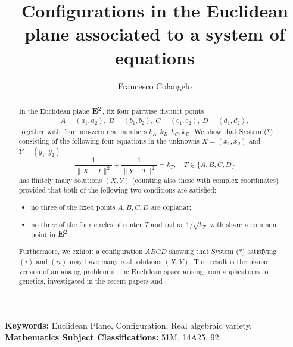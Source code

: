 \documentclass[10pt]{amsart}
\theoremstyle{definition}
\theoremstyle{remark}
\begin{document}
\title[Configurations in the Euclidean plane associated to a system of equations]{Configurations in the Euclidean plane associated to a system of equations}

\author{Francesco Colangelo}

\address{
University of Basilicata\\
Italy}





\date{}

\begin{abstract}
In the Euclidean plane ${\bf{E}}^2$, fix four pairwise distinct points
\begin{equation*}
\begin{array}{ccc}
A=(a_1,a_2),\ B=(b_1,b_2),\ C=(c_1,c_2),\ D=(d_1,d_2),
\end{array}
\end{equation*}
together with four non-zero real numbers $k_A,k_B,k_C,k_D$. We show that System (*) consisting of the following four equations
in the unknowns $X=(x_1,x_2)$ and $Y=(y_1,y_2)$
\begin{equation*}
\frac{1}{\|X-T\|^2}  +\frac{1}{\|Y-T\|^2}=k_T, \quad T\in\{A,B,C,D\}
\end{equation*}
has finitely many solutions $(X,Y)$ (counting also those with complex coordinates) provided that both of the following two conditions are satisfied:
\begin{itemize}
\item[($i$)] no three of the fixed points $A,B,C,D$ are coplanar;
\item[($ii$)] no three of the four circles of center $T$ and radius $1/\sqrt{k_T}$ with
share a common point in ${\bf{E}}^2$.
\end{itemize}
Furthermore, we exhibit a configuration $ABCD$ showing that System (*) satisfying $(i)$ and $(ii)$ may have many real solutions $(X,Y)$.  
This result is the planar version of an analog problem in the Euclidean space arising from applications to genetics, investigated in the recent papers \cite{cif} and \cite{ak2024}.
\end{abstract}

\maketitle
\noindent\textbf{Keywords:} Euclidean Plane, Configuration, Real algebraic variety.\\
\textbf{Mathematics Subject Classifications:} 51M, 14A25, 92.
\end{document}
